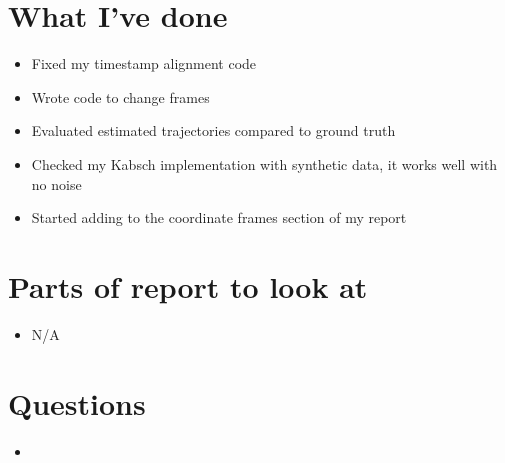 \documentclass[12pt,a4paper]{article}
\begin{document}
\author{Katrina Ashton}


\pagestyle{fancy}
\fancyhf{}
\rhead{\thepage}

\section{What I've done}
\begin{itemize}
  \item Fixed my timestamp alignment code
  \item Wrote code to change frames
  \item Evaluated estimated trajectories compared to ground truth
  \item Checked my Kabsch implementation with synthetic data, it works well with no noise
  \item Started adding to the coordinate frames section of my report
\end{itemize}

\section{Parts of report to look at}
\begin{itemize}
\item N/A
\end{itemize}

\section{Questions}
\begin{itemize}
\item 
\end{itemize}
\end{document}
